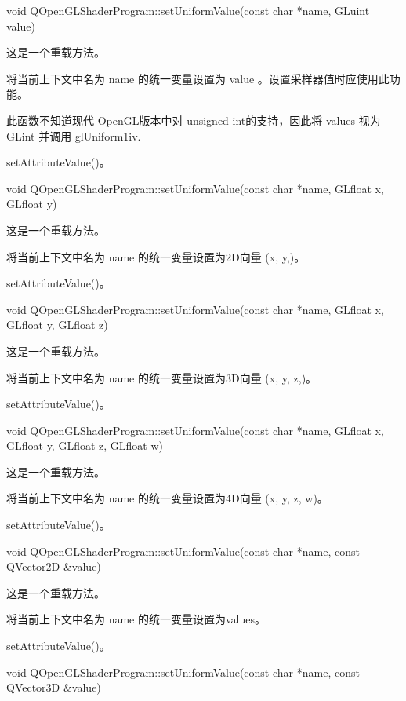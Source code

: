 void QOpenGLShaderProgram::setUniformValue(const char *name, GLuint value)

这是一个重载方法。

将当前上下文中名为 name 的统一变量设置为 value 。设置采样器值时应使用此功能。

\begin{notice}
此函数不知道现代 OpenGL版本中对 unsigned int的支持，因此将 values 视为 GLint 并调用 glUniform1iv.
\end{notice}

\begin{seeAlso}
setAttributeValue()。
\end{seeAlso}

void QOpenGLShaderProgram::setUniformValue(const char *name, GLfloat x, GLfloat y)

这是一个重载方法。

将当前上下文中名为 name 的统一变量设置为2D向量 (x, y,)。

\begin{seeAlso}
setAttributeValue()。
\end{seeAlso}

void QOpenGLShaderProgram::setUniformValue(const char *name, GLfloat x, GLfloat y, GLfloat z)

这是一个重载方法。

将当前上下文中名为 name 的统一变量设置为3D向量 (x, y, z,)。


\begin{seeAlso}
setAttributeValue()。
\end{seeAlso}

void QOpenGLShaderProgram::setUniformValue(const char *name, GLfloat x, GLfloat y, GLfloat z, GLfloat w)

这是一个重载方法。

将当前上下文中名为 name 的统一变量设置为4D向量 (x, y, z, w)。

\begin{seeAlso}
setAttributeValue()。
\end{seeAlso}

void QOpenGLShaderProgram::setUniformValue(const char *name, const QVector2D \&value)

这是一个重载方法。

将当前上下文中名为 name 的统一变量设置为values。


\begin{seeAlso}
setAttributeValue()。
\end{seeAlso}

void QOpenGLShaderProgram::setUniformValue(const char *name, const QVector3D \&value)

